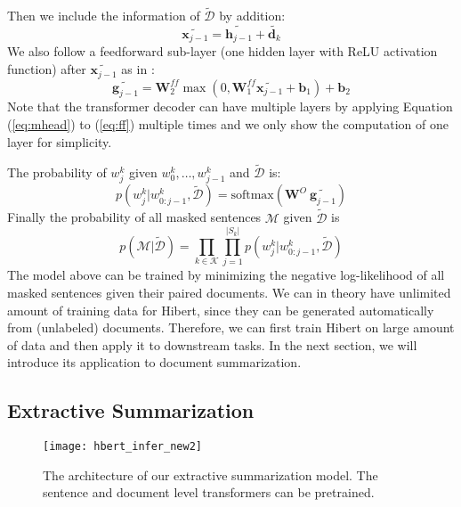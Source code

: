 \documentclass[11pt,a4paper]{article}
\begin{document}
Then we include the information of $\widetilde{ \mathcal{D} }$ by addition:
\begin{equation}
\tilde{\mathbf{x}_{j-1}} = \tilde{\mathbf{h}_{j-1}} + \tilde{ \mathbf{d}_k }
\end{equation}
We also follow a feedforward sub-layer (one hidden layer with ReLU \cite{glorot:2011:aistats} activation function) after $\tilde{\mathbf{x}_{j-1}}$ as in :
\begin{equation}
\label{eq:ff}
\tilde{\mathbf{g}_{j-1}} = \mathbf{W}^{ff}_2 \max(0, \mathbf{W}^{ff}_1 \tilde{\mathbf{x}_{j-1}} + \mathbf{b}_1) + \mathbf{b}_2
\end{equation}
Note that the transformer decoder can have multiple layers by applying Equation (\ref{eq:mhead}) to (\ref{eq:ff}) multiple times and we only show the computation of one layer for simplicity.


The probability of $w_j^k$ given $w_0^k,\dots,w_{j-1}^k$ and $\widetilde{ \mathcal{D} }$ is:
\begin{equation}
p( w_j^k | w_{0:j-1}^k, \widetilde{ \mathcal{D} } ) = \text{softmax}( \mathbf{W}^O \: \tilde{\mathbf{g}_{j-1}} )
\end{equation}
Finally the probability of all masked sentences $ \mathcal{M} $ given $\widetilde{ \mathcal{D} }$ is 
\begin{equation}
p(\mathcal{M} | \widetilde{ \mathcal{D} }) = \prod_{k \in \mathcal{K}} \prod_{j=1}^{|S_k|} p(w_j^k | w_{0:j-1}^k, \widetilde{ \mathcal{D} })
\end{equation}
The model above can be trained by minimizing the negative log-likelihood of all masked sentences given their paired documents. We can in theory have unlimited amount of training data for \mbox{{\sc Hibert}}, since they can be generated automatically from (unlabeled) documents. Therefore, we can first train {\sc Hibert} on large amount of data and then apply it to downstream tasks. In the next section, we will introduce its application to document summarization. 

\subsection{Extractive Summarization}
\label{sec:sum}
\begin{figure}[t]
	\centering
	\texttt{[image: hbert\_infer\_new2]}
	\caption{The architecture of our extractive summarization model. The sentence and document level transformers can be pretrained.}
	\label{fig:sum}
\end{figure}
\end{document}
